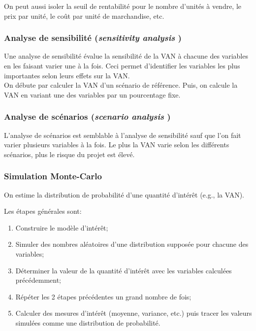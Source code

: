 \documentclass[10pt, french]{article}
\begin{document}
\begin{multicols*}{2}
On peut aussi isoler la seuil de rentabilité pour le nombre d'unités à vendre, le prix par unité, le coût par unité de marchandise, etc.


\subsubsection{Analyse de sensibilité (\og \textit{sensitivity analysis} \fg{})}
Une analyse de sensibilité évalue la sensibilité de la VAN à chacune des variables en les faisant varier une à la fois. Ceci permet d'identifier les variables les plus importantes selon leurs effets sur la VAN.\\

On débute par calculer la VAN d'un scénario de référence. Puis, on calcule la VAN en variant une des variables par un pourcentage fixe. 


\subsubsection{Analyse de scénarios (\og \textit{scenario analysis} \fg{})}
L'analyse de scénarios est semblable à l'analyse de sensibilité sauf que l'on fait varier plusieurs variables à la fois. Le plus la VAN varie selon les différents scénarios, plus le risque du projet est élevé.


\subsubsection{Simulation Monte-Carlo}
On estime la distribution de probabilité d'une quantité d'intérêt (e.g., la VAN).

Les étapes générales sont:
\begin{enumerate}[leftmargin = *]
	\item	Construire le modèle d'intérêt;
	\item	Simuler des nombres aléatoires d'une distribution supposée pour chacune des variables;
	\item	Déterminer la valeur de la quantité d'intérêt avec les variables calculées précédemment;
	\item	Répéter les 2 étapes précédentes un grand nombre de fois;
	\item	Calculer des mesures d'intérêt (moyenne, variance, etc.) puis tracer les valeurs simulées comme une distribution de probabilité.
\end{enumerate}




\end{multicols*}
\end{document}
